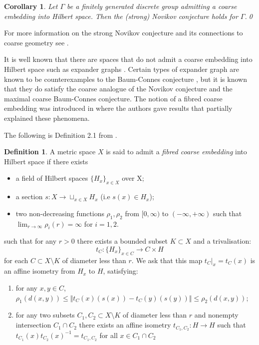 \documentclass[preprint]{elsarticle}
\theoremstyle{plain}
\newtheorem{corollary}[theorem]{Corollary}%
\theoremstyle{definition}%
\newtheorem{definition}[theorem]{Definition}%
\theoremstyle{remark}%
\begin{document}
\begin{corollary}
Let $\Gamma$ be a finitely generated discrete group admitting a coarse embedding into Hilbert space. Then the (strong) Novikov conjecture holds for $\Gamma$.\qed
\end{corollary}

For more information on the strong Novikov conjecture and its connections to coarse geometry see \cite{MR1388300, MR1905840}.

It is well known that there are spaces that do not admit a coarse embedding into Hilbert space such as expander graphs \cite{MR2569682}. Certain types of expander graph are known to be counterexamples to the Baum-Connes conjecture \cite{higsonpreprint,MR1911663,explg1,explg2,MR2568691}, but it is known that they do satisfy the coarse analogue of the Novikov conjecture and the maximal coarse Baum-Connes conjecture. The notion of a fibred coarse embedding was introduced in \cite{FCEpaper} where the authors gave results that partially explained these phenomena.

The following is Definition 2.1 from \cite{FCEpaper}.

\begin{definition}
A metric space $X$ is said to admit a \textit{fibred coarse embedding} into Hilbert space if there exists
\begin{itemize}
\item a field of Hilbert spaces $\lbrace H_{x} \rbrace_{x \in X}$ over X;
\item a section $s: X \rightarrow \sqcup_{x \in X}H_{x}$ (i.e $s(x) \in H_{x}$);
\item two non-decreasing functions $\rho_{1}, \rho_{2}$ from $[0,\infty)$ to $(-\infty, +\infty)$ such that $\lim_{r\rightarrow \infty}\rho_{i}(r)=\infty$ for $i=1,2$.
\end{itemize}
such that for any $r>0$ there exists a bounded subset $K\subset X$ and a trivalisation:
\begin{equation*}
t_{C}: \lbrace H_{x} \rbrace_{x \in C} \rightarrow C\times H
\end{equation*}
for each $C \subset X \setminus K$ of diameter less than $r$. We ask that this map $t_{C}|_{x}=t_{C}(x)$ is an affine isometry from  $H_{x}$ to $H$, satisfying:
\begin{enumerate}
\item for any $x,y \in C$, $\rho_{1}(d(x,y))\leq \Vert t_{C}(x)(s(x)) - t_{C}(y)(s(y)) \Vert \leq \rho_{2}(d(x,y))$;
\item for any two subsets $C_{1},C_{2} \subset X\setminus K$ of diameter less than $r$ and nonempty intersection $C_{1}\cap C_{2}$ there exists an affine isometry $t_{C_{1},C_{2}}:H \rightarrow H$ such that $t_{C_{1}}(x)t_{C_{2}}(x)^{-1}=t_{C_{1},C_{2}}$ for all $x \in C_{1}\cap C_{2}$
\end{enumerate}
\end{definition}
\end{document}
